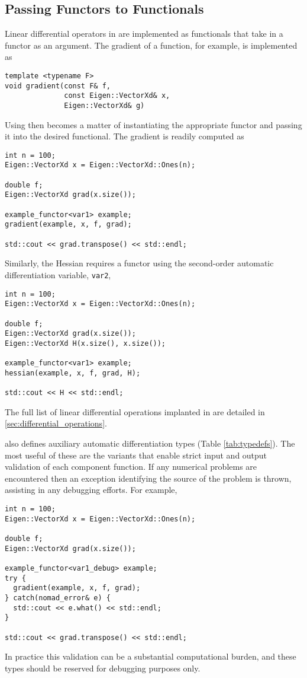\subsection{Passing Functors to Functionals}

Linear differential operators in \nomad are implemented as functionals that 
take in a functor as an argument.  The gradient of a function, for example,
is implemented as
%
\begin{verbatim}
template <typename F>
void gradient(const F& f,
              const Eigen::VectorXd& x,
              Eigen::VectorXd& g)
\end{verbatim}

Using \nomad then becomes a matter of instantiating the appropriate
functor and passing it into the desired functional.  The gradient is readily
computed as
%
\begin{verbatim}
int n = 100;
Eigen::VectorXd x = Eigen::VectorXd::Ones(n);
  
double f;
Eigen::VectorXd grad(x.size());
  
example_functor<var1> example;
gradient(example, x, f, grad);

std::cout << grad.transpose() << std::endl;
\end{verbatim}
%
Similarly, the Hessian requires a functor using the second-order automatic
differentiation variable, \verb|var2|,
\begin{verbatim}
int n = 100;
Eigen::VectorXd x = Eigen::VectorXd::Ones(n);
  
double f;
Eigen::VectorXd grad(x.size());
Eigen::VectorXd H(x.size(), x.size());
  
example_functor<var1> example;
hessian(example, x, f, grad, H);

std::cout << H << std::endl;
\end{verbatim}
%
The full list of linear differential operations implanted in \nomad are detailed 
in \ref{sec:differential_operations}.

\nomad also defines auxiliary automatic differentiation types 
(Table \ref{tab:typedefs}).  The most useful of these are the  
variants that enable strict input and output validation of each component function.  
If any numerical problems are encountered then an exception identifying the source 
of the problem is thrown, assisting in any debugging efforts.  For example,
%
\begin{verbatim}
int n = 100;
Eigen::VectorXd x = Eigen::VectorXd::Ones(n);
  
double f;
Eigen::VectorXd grad(x.size());
  
example_functor<var1_debug> example;
try {
  gradient(example, x, f, grad);
} catch(nomad_error& e) {
  std::cout << e.what() << std::endl;
}

std::cout << grad.transpose() << std::endl;
\end{verbatim}
%
In practice this validation can be a substantial computational burden,
and these types should be reserved for debugging purposes only.

